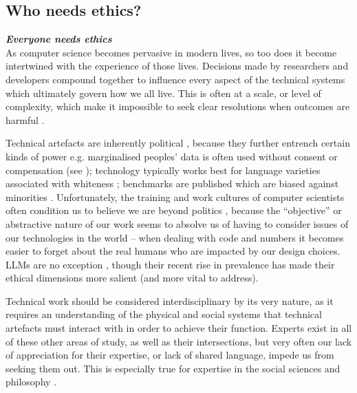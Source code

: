 
\subsection{Who needs ethics?}\label{subsec:who}

\noindent\textbf{\textit{Everyone needs ethics}} \\

\noindent As computer science becomes pervasive in modern lives, so too does it become intertwined with the experience of those lives. Decisions made by researchers and developers compound together to influence every aspect of the technical systems which ultimately govern how we all live. This is often at a scale, or level of complexity, which make it impossible to seek clear resolutions when outcomes are harmful \citep{van2020embedding, kasirzadeh2021reasons, miller2021technology, birhane_values_2022, santurkar2023whose, pistilli2024civics}. 

Technical artefacts are inherently political \cite{winner_artifacts_1980}, because they further entrench certain kinds of power e.g. marginalised peoples' data is often used without consent or compensation (see ); technology typically works best for language varieties associated with whiteness \citep{blodgett_racial_2017}; benchmarks are published which are biased against minorities \citep{buolamwini_gender_2018}. Unfortunately, the training and work cultures of computer scientists often condition us to believe we are beyond politics \citep{malazita2019infrastructures}, because the ``objective'' or abstractive nature of our work seems to absolve us of having to consider issues of our technologies in the world \citep{talat_disembodied_2021} – when dealing with code and numbers it becomes easier to forget about the real humans who are impacted by
our design choices. LLMs are no exception \citep{leidner_ethical_2017}, though their recent rise in prevalence has made their ethical dimensions more salient (and more vital to address). 

Technical work should be considered interdisciplinary by its very nature, as it requires an understanding of the physical and social systems that technical artefacts must interact with in order to achieve their function. Experts exist in all of these other areas of study, as well as their intersections, but very often our lack of appreciation for their expertise, or lack of shared language, impede us from seeking them out. This is especially true for expertise in the social sciences and philosophy \citep{raji2021you, inie_idr_2021, danks2022digital}.  

